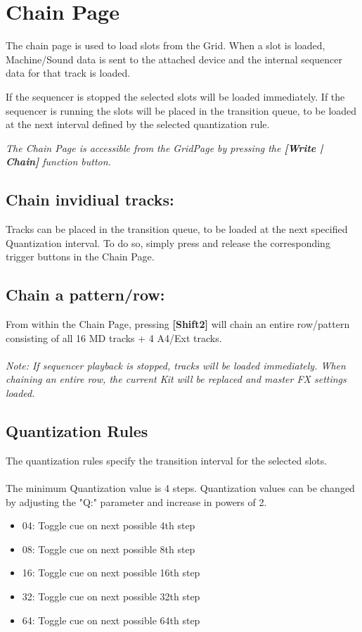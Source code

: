 \chapter{Chain Page}
The chain page is used to load slots from the Grid. When a slot is loaded, Machine/Sound data is sent to the attached device and the internal sequencer data for that track is loaded.

If the sequencer is stopped the selected slots will be loaded immediately. If the sequencer is running the slots will be placed in the transition queue, to be loaded at the next interval defined by the selected quantization rule.

\textit{The Chain Page is accessible from the GridPage by pressing the  \textbf{[Write | Chain]} function button.}



\section{Chain invidiual tracks:}
Tracks can be placed in the transition queue, to be loaded at the next specified Quantization interval. To do so, simply press and release the corresponding trigger buttons in the Chain Page.
\section{Chain a pattern/row:}
From within the Chain Page, pressing \textbf{[Shift2]} will chain an entire row/pattern consisting of all 16 MD tracks + 4 A4/Ext tracks.\\
\\
\textit{Note: If sequencer playback is stopped, tracks will be loaded immediately. When chaining an entire row, the current Kit will be replaced and master FX settings loaded.}
\newpage
\section{Quantization Rules}
The quantization rules specify the transition interval for the selected slots.\\
\\
The minimum Quantization value is 4 steps. Quantization values can be changed by adjusting the "Q:" parameter and increase in powers of 2.\\
\begin{itemize}
\item 04: Toggle cue on next possible 4th step
\item 08: Toggle cue on next possible 8th step 
\item 16: Toggle cue on next possible 16th step 
\item 32: Toggle cue on next possible 32th step 
\item 64: Toggle cue on next possible 64th step
\end{itemize}